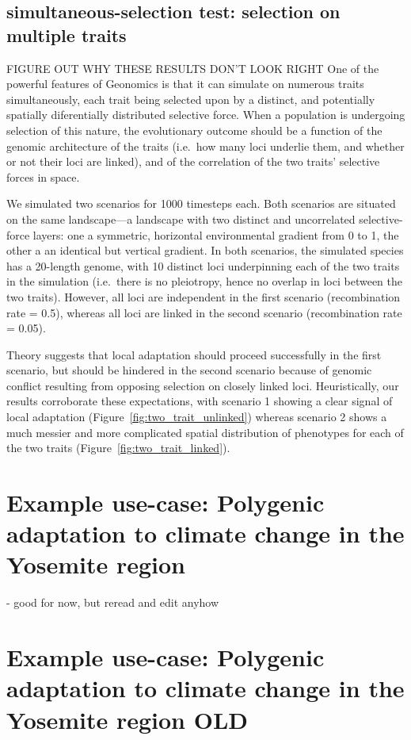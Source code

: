 ﻿\documentclass{article}
\begin{document}
\subsection{simultaneous-selection test: selection on multiple traits}
{\large FIGURE OUT WHY THESE RESULTS DON'T LOOK RIGHT}
One of the powerful features of Geonomics is that it can simulate on numerous traits simultaneously,
each trait being selected upon by a distinct, and potentially spatially diferentially distributed selective force.
When a population is undergoing selection of this nature, the evolutionary outcome should be a function of the
genomic architecture of the traits (i.e.\ how many loci underlie them, and whether or not their loci are linked),
and of the correlation of the two traits' selective forces in space.

We simulated two scenarios for 1000 timesteps each. Both scenarios are situated on the same
landscape---a landscape with two distinct and uncorrelated selective-force layers: 
one a symmetric, horizontal environmental gradient from 0 to 1, the other a
an identical but vertical gradient.
In both scenarios, the simulated species has a 20-length genome, with 10 distinct loci underpinning
each of the two traits in the simulation (i.e.\ there is no pleiotropy, hence no overlap
in loci between the two traits). However, all loci are independent in the first scenario (recombination
rate = 0.5), whereas all loci are linked in the second scenario (recombination rate = 0.05).

Theory suggests that local adaptation should proceed successfully in the first scenario, but should be
hindered in the second scenario because of genomic conflict resulting from opposing selection
on closely linked loci.
Heuristically, our results corroborate these expectations, with scenario 1 showing a clear
signal of local adaptation (Figure~\ref{fig:two_trait_unlinked}) whereas scenario 2 shows a much messier and more complicated
spatial distribution of phenotypes for each of the two traits (Figure~\ref{fig:two_trait_linked}).


\section{Example use-case: Polygenic adaptation to climate change in the Yosemite region}
- good for now, but reread and edit anyhow


\section{Example use-case: Polygenic adaptation to climate change in the Yosemite region OLD}
\end{document}
